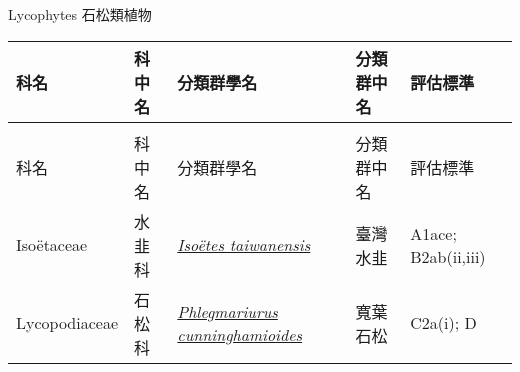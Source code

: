 \noindent\normalfont\selectfont Lycophytes 石松類植物
\footnotesize\selectfont
        {\def\arraystretch{1.5}\tabcolsep=2pt
        \begin{longtable}{p{2.5cm}p{2.5cm}p{4.5cm}p{2.5cm}p{3cm}}
        \toprule
          科名 & 科中名 & 分類群學名 & 分類群中名 & 評估標準 \\
        \midrule 
        \endfirsthead

        \multicolumn{4}{l}{\bfseries\Large\color{red}{國家極危 (NCR) 類別維管束植物名錄(續)}} \\
        \toprule
        科名 & 科中名 & 分類群學名 & 分類群中名 & 評估標準 \\
        \midrule
        \endhead
                Isoëtaceae & 水韭科 & \href{http://www.theplantlist.org/tpl1.1/search?q=Isoëtes+taiwanensis}{\textit{Isoëtes taiwanensis} } & 臺灣水韭 & A1ace; B2ab(ii,iii) \index{Isoëtes@\textit{Isoëtes}!taiwanensis@\textit{taiwanensis}}  \index{臺灣水韭} \\
    Lycopodiaceae & 石松科 & \href{http://www.theplantlist.org/tpl1.1/search?q=Phlegmariurus+cunninghamioides}{\textit{Phlegmariurus cunninghamioides} } & 寬葉石松 & C2a(i); D \index{Phlegmariurus@\textit{Phlegmariurus}!cunninghamioides@\textit{cunninghamioides}}  \index{寬葉石松} \\
    \bottomrule
        \end{longtable}
        }
    